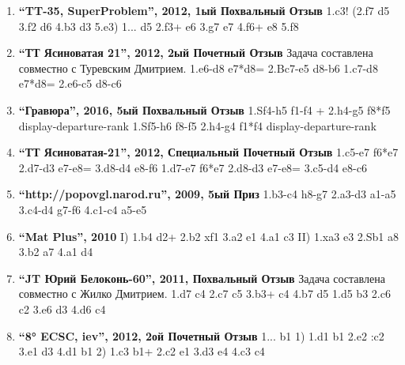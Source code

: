 \begin{enumerate}
\item \textbf{ ``TT-35, SuperProblem'', 2012, 1ый Похвальный Отзыв } 1.\king{}c3! (2.\queen{}f7 d5 3.\queen{}f2 d6 4.\king{}b3 \king{}d3 5.\queen{}e3\mate{})
  1... \king{}d5 2.\queen{}f3+ \king{}e6 3.\bishop{}g7 \king{}e7 4.\queen{}f6+ \king{}e8 5.\queen{}f8\mate{}

\item \textbf{ ``ТТ Ясиноватая 21'', 2012, 2ый Почетный Отзыв } Задача составлена совместно с Туревским Дмитрием.
1.\knight{}e6-d8 e7*d8=\bishop{} 2.Bc7-e5 \bishop{}d8-b6 \mate{}
1.\bishop{}c7-d8 e7*d8=\knight{} 2.\knight{}e6-c5 \knight{}d8-c6 \mate{}

\item \textbf{ ``Гравюра'', 2016, 5ый Похвальный Отзыв } 1.Sf4-h5 \rook{}f1-f4 +   2.\king{}h4-g5 \rook{}f8*f5 \mate{} {display-departure-rank}
1.Sf5-h6 \rook{}f8-f5   2.\king{}h4-g4 \rook{}f1*f4 \mate{} {display-departure-rank}

\item \textbf{ ``ТТ Ясиноватая-21'', 2012, Специальный Почетный Отзыв } 1.\bishop{}c5-e7 f6*e7   2.\rook{}d7-d3 e7-e8=\knight{}  3.\rook{}d8-d4 \knight{}e8-f6 \mate{} 
1.\rook{}d7-e7 f6*e7   2.\rook{}d8-d3 e7-e8=\bishop{}   3.\bishop{}c5-d4 \bishop{}e8-c6 \mate{}

\item \textbf{ ``http://popovgl.narod.ru'', 2009, 5ый Приз } 1.\king{}b3-c4 \king{}h8-g7 2.\queen{}a3-d3 \queen{}a1-a5 3.\king{}c4-d4 \king{}g7-f6 4.\queen{}c1-c4 \queen{}a5-e5 \mate{}

\item \textbf{ ``Mat Plus'', 2010 } I) 1.\knight{}b4 \bishop{}d2+ 2.\king{}b2 \rook{}xf1 3.\knight{}a2 \bishop{}e1 4.\king{}a1 \bishop{}c3\mate{}
II) 1.\knight{}xa3 \bishop{}e3 2.Sb1 \rook{}a8 3.\king{}b2 \bishop{}a7 4.\king{}a1 \bishop{}d4\mate{}

\item \textbf{ ``JT Юрий Белоконь-60'', 2011, Похвальный Отзыв }  Задача составлена совместно с Жилко Дмитрием. 1.\knight{}d7 c4 2.\bishop{}c7 c5 3.\rook{}b3+ \king{}c4 4.\rook{}b7 d5\mate{} 
1.\king{}d5 \king{}b3 2.\knight{}c6 \king{}c2 3.\rook{}e6 \king{}d3 4.\bishop{}d6 c4\mate{}

\item \textbf{ ``8° ECSC, \king{}iev'', 2012, 2ой Почетный Отзыв } 1... \rook{}b1\mate{}
1)  1.\king{}d1 \king{}b1 2.\king{}e2 \king{}:c2 3.\king{}e1 \king{}d3 4.\king{}d1 \rook{}b1\mate{}
2)  1.\rook{}c3 \rook{}b1+ 2.\king{}c2 \rook{}e1 3.\rook{}d3 \rook{}e4 4.\king{}c3 \rook{}c4\mate{}


\end{enumerate}
